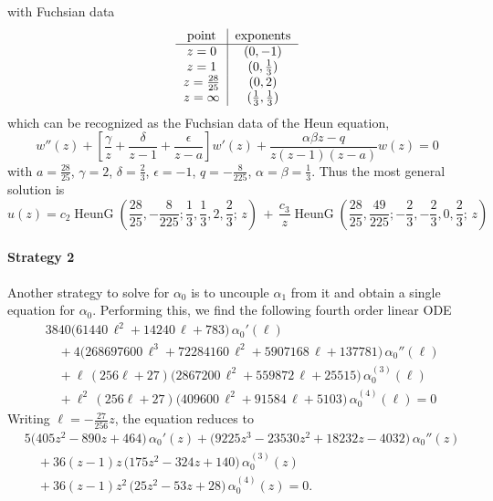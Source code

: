 \documentclass[11pt, a4paper]{article}
\newcommand{\HeunG}{\operatorname{HeunG}}
\numberwithin{equation}{section}
\begin{document}
with Fuchsian data
\begin{equation}
\begin{tabular}{c|c}
point & exponents \\
\hline
$z=0$      & $(0, -1)$ \\
$z=1$      & $(0, \tfrac13)$ \\
$z=\tfrac{28}{25}$ & $(0, 2)$ \\
$z=\infty$ & $(\tfrac13, \tfrac13)$ \\
\end{tabular}
\end{equation}
which can be recognized as the Fuchsian data of the Heun equation,
\begin{equation}
  w''(z) + \left[ \frac{\gamma}{z} + \frac{\delta}{z-1} + \frac{\epsilon}{z-a} \right] w'(z) + \frac{\alpha \beta z - q}{z(z-1)(z-a)} w(z) = 0
\end{equation}
with $a = \frac{28}{25}$, $\gamma=2$, $\delta = \tfrac23$, $\epsilon = -1$, $q = -\frac{8}{225}$, $\alpha = \beta = \tfrac13$. Thus the most general solution is
\begin{equation}
  u(z) = c_2 \HeunG\!\left(\frac{28}{25},-\frac{8}{225};\frac{1}{3},\frac{1}{3}, 2,\frac{2}{3};\,z\right) \, + \, \frac{c_3}{z} \HeunG\!\left(\frac{28}{25},\frac{49}{225};-\frac{2}{3},-\frac{2}{3}, 0,\frac{2}{3};\,z\right)
\end{equation}

\paragraph{Strategy 2}
Another strategy to solve for $\alpha_0$ is to uncouple $\alpha_1$ from it and obtain a single equation for $\alpha_0$. Performing this, we find the following fourth order linear ODE
\begin{equation}
\begin{aligned}
&3840\bigl(61440\,\ell^{2}+14240\,\ell+783\bigr)\,\alpha_{0}'(\ell)\\
&\quad+4\bigl(268697600\,\ell^{3}+72284160\,\ell^{2}+5907168\,\ell+137781\bigr)\,\alpha_{0}''(\ell)\\
&\quad+\ell\,(256\ell+27)\bigl(2867200\,\ell^{2}+559872\,\ell+25515\bigr)\,\alpha_{0}^{(3)}(\ell)\\
&\quad+\ell^{2}\,(256\ell+27)\bigl(409600\,\ell^{2}+91584\,\ell+5103\bigr)\,\alpha_{0}^{(4)}(\ell) = 0
\end{aligned}
\end{equation}
Writing $\ell = -\tfrac{27}{256}z$, the equation reduces to
\begin{equation}
\begin{aligned}
&5\bigl(405 z^{2}-890 z+464\bigr)\,\alpha_{0}'(z)
+\bigl(9225 z^{3}-23530 z^{2}+18232 z-4032\bigr)\,\alpha_{0}''(z)\\
&\quad+36(z-1)z\,\bigl(175 z^{2}-324 z+140\bigr)\,\alpha_{0}^{(3)}(z)\\
&\quad+36(z-1)z^{2}\,\bigl(25 z^{2}-53 z+28\bigr)\,\alpha_{0}^{(4)}(z)
=0.
\end{aligned}
\end{equation}
\end{document}
